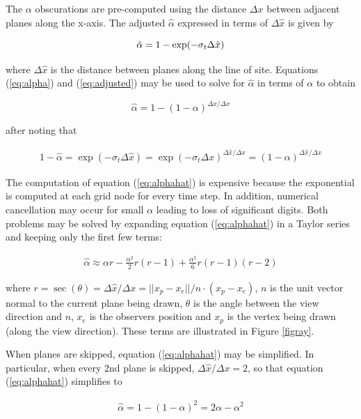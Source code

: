 The $\alpha$ obscurations are pre-computed using the distance $\Delta x$ between adjacent planes along the x-axis. The adjusted $\hat{\alpha}$ expressed in terms of $\Delta\hat{x}$ is given by

\begin{equation}
\label{eq:adjusted}
\hat{\alpha}=1-\exp(-\sigma_t\Delta \hat{x})\\
\end{equation}

where $\Delta\hat{x}$ is the distance between planes along the line of site.  Equations (\ref{eq:alpha}) and (\ref{eq:adjusted}) may be used to solve for $\hat{\alpha}$ in terms of $\alpha$ to obtain

\begin{equation}
\label{eq:alphahat}
\hat{\alpha}=1-(1-\alpha)^{\Delta\hat{x}/\Delta x}
\end{equation}

after noting that

\begin{eqnarray*}
1-\hat{\alpha}=\exp(-\sigma_t\Delta\hat{x})=\exp(-\sigma_t\Delta
x)^{\Delta\hat{x}/\Delta x}=(1-\alpha)^{\Delta\hat{x}/\Delta x}
\end{eqnarray*}

The computation of equation (\ref{eq:alphahat}) is expensive because the exponential is computed at each grid node for every time step.  In addition, numerical cancellation may occur for small $\alpha$ leading to loss of significant digits. Both problems may be solved by expanding equation (\ref{eq:alphahat}) in a Taylor series and keeping only the first few terms:

\begin{eqnarray*}
\hat{\alpha}\approx \alpha r -
\frac{\alpha^2}{2}r(r-1)+\frac{\alpha^3}{6}r(r-1)(r-2)
\end{eqnarray*}

where $r=\sec(\theta)=\Delta \hat{x}/\Delta x=||x_p-x_e||/n\cdot(x_p-x_e)$, $n$ is the unit vector normal to the current plane being drawn, $\theta$ is the angle between the view direction and $n$, $x_e$ is the observers position and $x_p$ is the vertex being drawn (along the view direction).  These terms are illustrated in Figure \ref{figray}.

When planes are skipped, equation (\ref{eq:alphahat}) may be simplified.  In particular, when every 2nd plane is skipped, $\Delta\hat{x}/\Delta x=2$, so that equation (\ref{eq:alphahat})
simplifies to

\begin{eqnarray*}
\hat{\alpha}=1-(1-\alpha)^2=2\alpha-\alpha^2
\end{eqnarray*}

